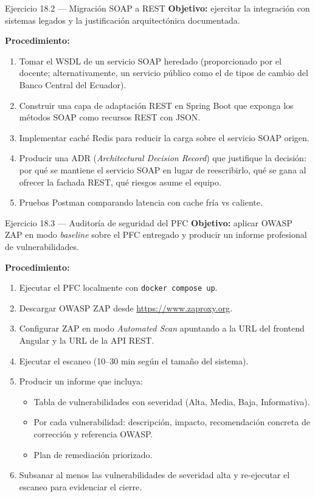 \documentclass[11pt,a4paper,openany]{book}
\begin{document}
\begin{cajaejercicio}{Ejercicio 18.2 --- Migración SOAP a REST}
\textbf{Objetivo:} ejercitar la integración con sistemas legados
y la justificación arquitectónica documentada.

\textbf{Procedimiento:}
\begin{enumerate}
\item Tomar el WSDL de un servicio SOAP heredado (proporcionado por
el docente; alternativamente, un servicio público como el de tipos de
cambio del Banco Central del Ecuador).
\item Construir una capa de adaptación REST en Spring Boot que
exponga los métodos SOAP como recursos REST con JSON.
\item Implementar caché Redis para reducir la carga sobre el servicio
SOAP origen.
\item Producir una ADR (\emph{Architectural Decision Record}) que
justifique la decisión: por qué se mantiene el servicio SOAP
en lugar de reescribirlo, qué se gana al ofrecer la fachada REST,
qué riesgos asume el equipo.
\item Pruebas Postman comparando latencia con cache fría vs caliente.
\end{enumerate}
\end{cajaejercicio}

\begin{cajaejercicio}{Ejercicio 18.3 --- Auditoría de seguridad del PFC}
\textbf{Objetivo:} aplicar OWASP ZAP en modo \emph{baseline} sobre el
PFC entregado y producir un informe profesional de vulnerabilidades.

\textbf{Procedimiento:}
\begin{enumerate}
\item Ejecutar el PFC localmente con \texttt{docker compose up}.
\item Descargar OWASP ZAP desde \url{https://www.zaproxy.org}.
\item Configurar ZAP en modo \emph{Automated Scan} apuntando a la URL
del frontend Angular y la URL de la API REST.
\item Ejecutar el escaneo (10--30 min según el tamaño del sistema).
\item Producir un informe que incluya:
\begin{itemize}
\item Tabla de vulnerabilidades con severidad (Alta, Media, Baja,
Informativa).
\item Por cada vulnerabilidad: descripción, impacto, recomendación
concreta de corrección y referencia OWASP.
\item Plan de remediación priorizado.
\end{itemize}
\item Subsanar al menos las vulnerabilidades de severidad alta y
re-ejecutar el escaneo para evidenciar el cierre.
\end{enumerate}
\end{cajaejercicio}
\end{document}
